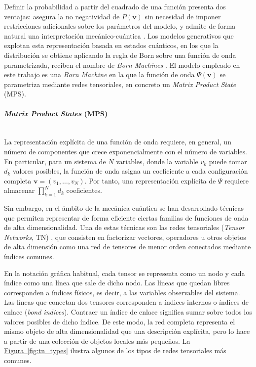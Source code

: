 \documentclass[12pt]{extarticle}
\numberwithin{equation}{section}
\begin{document}
\begin{refsection}
Definir la probabilidad a partir del cuadrado de una función presenta dos ventajas: asegura la no negatividad de $P(\mathbf{v})$ sin necesidad de imponer restricciones adicionales sobre los parámetros del modelo, y admite de forma natural una interpretación mecánico-cuántica \cite{han2018unsupervised}. Los modelos
generativos que explotan esta representación basada en estados cuánticos, en los
que la distribución se obtiene aplicando la regla de Born sobre una función de
onda parametrizada, reciben el nombre de \textit{Born Machines} \cite{han2018unsupervised}. El modelo empleado en este trabajo es una \textit{Born Machine} en la que la
función de onda $\Psi(\mathbf{v})$ se parametriza mediante redes tensoriales, en concreto un \textit{Matrix Product State} (MPS).

\paragraph{\textit{Matrix Product States} (MPS)}
\label{par:matrixproductstates}
\mbox{}\\

La representación explícita de una función de onda requiere, en general, un número de componentes que crece exponencialmente con el número de variables. En particular, para un sistema de $N$ variables, donde la variable $v_k$ puede tomar $d_k$ valores posibles, la función de onda asigna un coeficiente a cada configuración completa $\mathbf{v}=(v_1,\ldots,v_N)$. Por tanto, una representación explícita de $\Psi$ requiere almacenar $\prod_{k=1}^{N} d_k$ coeficientes. 

Sin embargo, en el ámbito de la mecánica cuántica se han desarrollado técnicas que permiten representar de forma eficiente ciertas familias de funciones de onda de alta dimensionalidad. Una de estas técnicas son las redes tensoriales (\textit{Tensor Networks}, TN) \cite{orus2014practical}, que consisten en factorizar vectores, operadores u otros objetos de alta dimensión como una red de tensores de menor orden conectados mediante índices comunes.

En la notación gráfica habitual, cada tensor se representa como un nodo y cada índice como una línea que sale de dicho nodo. Las líneas que quedan libres corresponden a índices físicos, es decir, a las variables observables del sistema. Las líneas que conectan dos tensores corresponden a índices internos o índices de enlace (\textit{bond indices}). Contraer un índice de enlace significa sumar sobre todos los valores posibles de dicho índice. De este modo, la red completa representa el mismo objeto de alta dimensionalidad que una descripción explícita, pero lo hace a partir de una colección de objetos locales más pequeños. La \hyperref[fig:tn_types]{Figura~\ref*{fig:tn_types}} ilustra algunos de los tipos de redes tensoriales más comunes.


\end{refsection}
\end{document}
